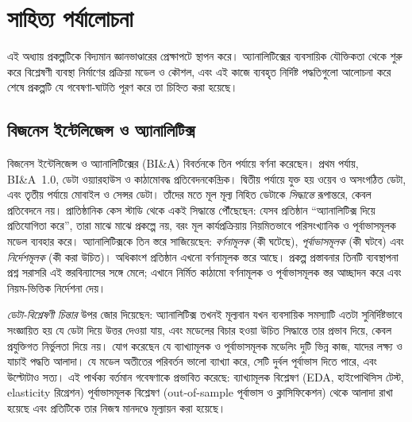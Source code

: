 \chapter{সাহিত্য পর্যালোচনা}\label{ch:literature}

এই অধ্যায় প্রকল্পটিকে বিদ্যমান জ্ঞানভাণ্ডারের প্রেক্ষাপটে স্থাপন করে। অ্যানালিটিক্সের ব্যবসায়িক যৌক্তিকতা থেকে শুরু করে বিশ্লেষণী
ব্যবস্থা নির্মাণের প্রক্রিয়া মডেল ও কৌশল, এবং এই কাজে ব্যবহৃত নির্দিষ্ট পদ্ধতিগুলো আলোচনা করে শেষে প্রকল্পটি যে গবেষণা-ঘাটতি
পূরণ করে তা চিহ্নিত করা হয়েছে।

\section{বিজনেস ইন্টেলিজেন্স ও অ্যানালিটিক্স}
\citet{chen2012} বিজনেস ইন্টেলিজেন্স ও অ্যানালিটিক্সের (BI\&A) বিবর্তনকে তিন পর্যায়ে বর্ণনা করেছেন। প্রথম পর্যায়, BI\&A~1.0,
ডেটা ওয়্যারহাউস ও কাঠামোবদ্ধ প্রতিবেদনকেন্দ্রিক। দ্বিতীয় পর্যায়ে যুক্ত হয় ওয়েব ও অসংগঠিত ডেটা, এবং তৃতীয় পর্যায়ে মোবাইল ও সেন্সর
ডেটা। তাঁদের মতে মূল মূল্য নিহিত ডেটাকে \emph{সিদ্ধান্তে} রূপান্তরে, কেবল প্রতিবেদনে নয়। \citet{davenport2007} প্রাতিষ্ঠানিক কেস
স্টাডি থেকে একই সিদ্ধান্তে পৌঁছেছেন: যেসব প্রতিষ্ঠান ``অ্যানালিটিক্স দিয়ে প্রতিযোগিতা করে'', তারা মাঝে মাঝে প্রকল্পে নয়, বরং মূল
কার্যপ্রক্রিয়ায় নিয়মিতভাবে পরিসংখ্যানিক ও পূর্বাভাসমূলক মডেল ব্যবহার করে। \citet{sharda2018} অ্যানালিটিক্সকে তিন স্তরে
সাজিয়েছেন: \emph{বর্ণনামূলক} (কী ঘটেছে), \emph{পূর্বাভাসমূলক} (কী ঘটবে) এবং \emph{নির্দেশমূলক} (কী করা উচিত)। অধিকাংশ প্রতিষ্ঠান
এখনো বর্ণনামূলক স্তরে আছে। প্রকল্প প্রস্তাবনার তিনটি ব্যবস্থাপনা প্রশ্ন সরাসরি এই স্তরবিন্যাসের সঙ্গে মেলে; এখানে নির্মিত কাঠামো
বর্ণনামূলক ও পূর্বাভাসমূলক স্তর আচ্ছাদন করে এবং নিয়ম-ভিত্তিক নির্দেশনা দেয়।

\citet{provost2013} \emph{ডেটা-বিশ্লেষণী চিন্তার} উপর জোর দিয়েছেন: অ্যানালিটিক্স তখনই মূল্যবান যখন ব্যবসায়িক সমস্যাটি এতটা
সুনির্দিষ্টভাবে সংজ্ঞায়িত হয় যে ডেটা দিয়ে উত্তর দেওয়া যায়, এবং মডেলের বিচার হওয়া উচিত সিদ্ধান্তে তার প্রভাব দিয়ে, কেবল প্রযুক্তিগত
নির্ভুলতা দিয়ে নয়। \citet{shmueli2010} যোগ করেছেন যে ব্যাখ্যামূলক ও পূর্বাভাসমূলক মডেলিং দুটি ভিন্ন কাজ, যাদের লক্ষ্য ও যাচাই
পদ্ধতি আলাদা। যে মডেল অতীতের পরিবর্তন ভালো ব্যাখ্যা করে, সেটি দুর্বল পূর্বাভাস দিতে পারে, এবং উল্টোটাও সত্য। এই পার্থক্য
বর্তমান গবেষণাকে প্রভাবিত করেছে: ব্যাখ্যামূলক বিশ্লেষণ (EDA, হাইপোথিসিস টেস্ট, elasticity রিগ্রেশন) পূর্বাভাসমূলক বিশ্লেষণ
(out-of-sample পূর্বাভাস ও ক্লাসিফিকেশন) থেকে আলাদা রাখা হয়েছে এবং প্রতিটিকে তার নিজস্ব মানদণ্ডে মূল্যায়ন করা হয়েছে।

